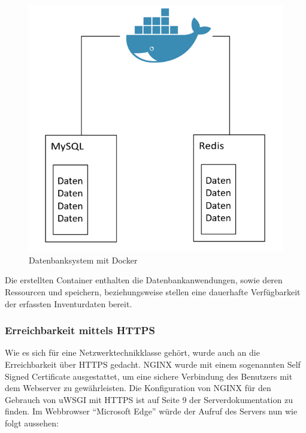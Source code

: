 \begin{figure}[ht]
\centering
\includegraphics{docker.png}
\caption{Datenbanksystem mit Docker}
\end{figure}

Die erstellten Container enthalten die Datenbankanwendungen, sowie deren
Ressourcen und speichern, beziehungsweise stellen eine dauerhafte
Verfügbarkeit der erfassten Inventurdaten bereit.

\hypertarget{erreichbarkeit-mittels-https}{%
\subsubsection{Erreichbarkeit mittels
HTTPS}\label{erreichbarkeit-mittels-https}}

Wie es sich für eine Netzwerktechnikklasse gehört, wurde auch an die
Erreichbarkeit über HTTPS gedacht. NGINX wurde mit einem sogenannten
Self Signed Certificate ausgestattet, um eine sichere Verbindung des
Benutzers mit dem Webserver zu gewährleisten. Die Konfiguration von
NGINX für den Gebrauch von uWSGI mit HTTPS ist auf Seite 9 der
Serverdokumentation zu finden. Im Webbrowser ``Microsoft Edge'' würde
der Aufruf des Servers nun wie folgt aussehen:


